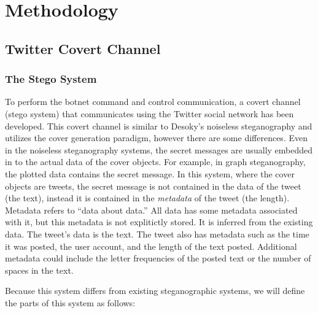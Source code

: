 \section{Methodology}
\label{cha:methodology}

\subsection{Twitter Covert Channel}
\label{sec:methodology:twittercc}

\subsubsection{The Stego System}
\label{subsec:methodology:twittercc:stego}

To perform the botnet command and control communication, a covert channel
(stego system) that communicates using the Twitter social network has been
developed.  This covert channel is similar to Desoky's \cite{nostega} noiseless
steganography and utilizes the cover generation paradigm, however there are some differences.
Even in the noiseless steganography systems, the secret messages are
usually embedded in to the actual data of the cover objects.  For example, in
graph steganography, the plotted data contains the secret message.  In this
system, where the cover objects are tweets, the secret message is not contained
in the data of the tweet (the text), instead it is contained in the
\emph{metadata} of the tweet (the length).  Metadata refers to ``data about
data.''  All data has some metadata associated with it, but this metadata is not
explitictly stored.  It is inferred from the existing data.  The tweet's data is
the text.  The tweet also has metadata such as the time it was posted, the user
account, and the length of the text posted.  Additional metadata could include
the letter frequencies of the posted text or the number of spaces in the text.

Because this system differs from existing steganographic systems, we will
define the parts of this system as follows:

